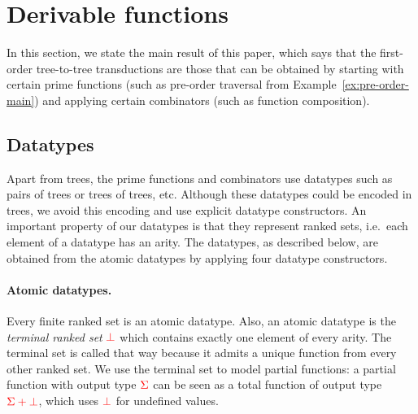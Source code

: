 \section{Derivable functions}\label{sec:derivable-functions}
In this section, we state the main result of this paper, which says that the  first-order tree-to-tree transductions are those that  can be  obtained by starting with certain prime functions (such as pre-order traversal from Example~\ref{ex:pre-order-main}) and applying certain  combinators (such as function composition). 

\subsection{Datatypes}
\label{sec:datatype-constructors}
Apart from trees, the prime functions and combinators  use  datatypes  such as pairs of trees or trees of trees, etc. Although these datatypes  could be encoded in trees, we avoid this encoding and use explicit datatype constructors. An important property of our datatypes is that they represent ranked sets, i.e.~each element of a datatype has an arity. The datatypes, as described below, are obtained from the atomic datatypes by applying four datatype constructors.

\paragraph*{Atomic datatypes.} Every finite ranked set is an atomic datatype. Also, an atomic datatype is the   \emph{terminal ranked set}  ${\color{red}{\bot}}$ which contains exactly one element of every arity.
The terminal set is called that way because it admits a unique function from every other ranked set. 
We use the terminal set to model partial functions: a partial function with output  type  ${\color{red}{\Sigma}}$ can be seen as a total function of output type ${\color{red}{{\color{red}{\Sigma}}+ {\color{red}{\bot}}}}$, which uses  ${\color{red}{\bot}}$  for  undefined values.


